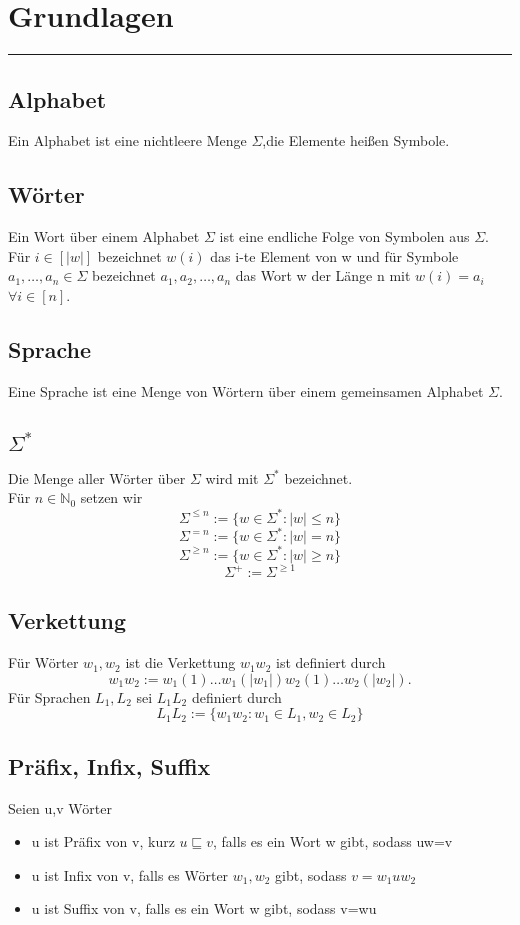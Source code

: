 \section{Grundlagen}
\rule{\textwidth}{0.4pt}
\newpage
\subsection{Alphabet}
    Ein Alphabet ist eine nichtleere Menge \(\Sigma\),die Elemente heißen Symbole.
\subsection{Wörter}
    Ein Wort über einem Alphabet \(\Sigma\) ist eine endliche Folge von Symbolen aus \(\Sigma\).\\
    Für \(i\in[|w|]\) bezeichnet \(w(i)\) das i-te Element von w und für Symbole \(a_1,\dots,a_n\in \Sigma\)
    bezeichnet \(a_1,a_2,\dots,a_n\) das Wort w der Länge n mit \(w(i)=a_i\) \(\forall i\in [n]\).
\subsection{Sprache}
    Eine Sprache ist eine Menge von Wörtern über einem gemeinsamen Alphabet \(\Sigma\).
\subsection{\(\Sigma^*\)}
    Die Menge aller Wörter über \(\Sigma\) wird mit \(\Sigma^*\) bezeichnet.\\
    Für \(n\in\mathbb{N}_0\) setzen wir
    \[\Sigma^{\leq n}:=\{w\in\Sigma^*:|w|\leq n\}\]
    \[\Sigma^{=n}:=\{w\in\Sigma^*:|w|=n\}\]
    \[\Sigma^{\geq n}:=\{w\in\Sigma^*:|w|\geq n\}\]
    \[\Sigma^{+}:=\Sigma^{\geq 1}\]
\subsection{Verkettung}
    Für Wörter \(w_1,w_2\) ist die Verkettung \(w_1w_2\) ist definiert durch 
    \[w_1w_2:=w_1(1)\dots w_1(|w_1|)w_2(1)\dots w_2(|w_2|).\]
    Für Sprachen \(L_1,L_2\) sei \(L_1L_2\) definiert durch 
    \[L_1L_2:=\{w_1w_2:w_1\in L_1, w_2\in L_2\}\]
\subsection{Präfix, Infix, Suffix}
    Seien u,v Wörter 
    \begin{itemize}
        \item u ist Präfix von v, kurz \(u\sqsubseteq v\), falls es ein Wort w gibt, sodass uw=v 
        \item u ist Infix von v, falls es Wörter \(w_1,w_2\) gibt, sodass \(v=w_1uw_2\)
        \item u ist Suffix von v, falls es ein Wort w gibt, sodass v=wu
    \end{itemize}
